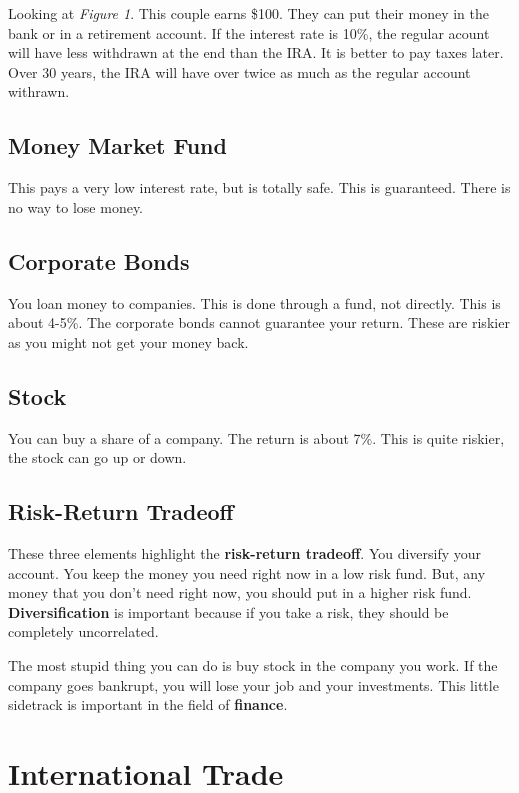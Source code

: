 \documentclass{article}
\begin{document}
Looking at \textit{Figure 1}. This couple earns  \$100. They can put their money
in the bank or in a retirement account. If the interest rate is 10\%, the
regular acount will have less withdrawn at the end than the IRA. It is better to
pay taxes later. Over 30 years, the IRA will have over twice as much as the
regular account withrawn.

\subsection{Money Market Fund}

This pays a very low interest rate, but is totally safe. This is guaranteed.
There is no way to lose money.

\subsection{Corporate Bonds}

You loan money to companies. This is done through a fund, not directly. This is
about 4-5\%. The corporate bonds cannot guarantee your return. These are riskier
as you might not get your money back.

\subsection{Stock}

You can buy a share of a company. The return is about 7\%. This is quite
riskier, the stock can go up or down.

\subsection{Risk-Return Tradeoff}

These three elements highlight the \textbf{risk-return tradeoff}. You diversify
your account. You keep the money you need right now in a low risk fund. But, any
money that you don't need right now, you should put in a higher risk fund.
\textbf{Diversification} is important because if you take a risk, they should be
completely uncorrelated.

The most stupid thing you can do is buy stock in the company you work. If the
company goes bankrupt, you will lose your job and your investments. This little
sidetrack is important in the field of \textbf{finance}. 

\section{International Trade}
\end{document}
